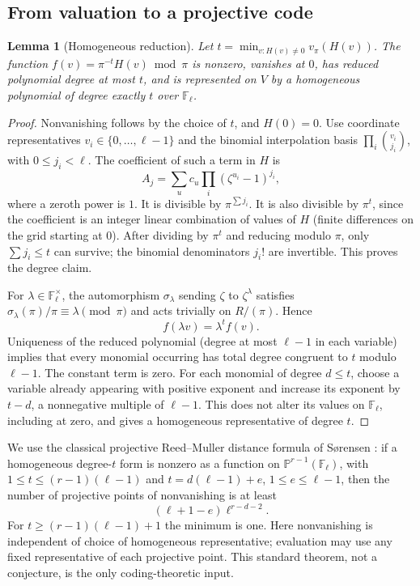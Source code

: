 \documentclass[11pt]{article}
\newtheorem{lemma}[theorem]{Lemma}
\theoremstyle{remark}\newtheorem{remark}[theorem]{Remark}
\newcommand{\F}{\mathbb F}
\begin{document}
\subsection{From valuation to a projective code}
\begin{lemma}[Homogeneous reduction]\label{lem:hom}
Let $t=\min_{v:H(v)\ne0}v_\pi(H(v))$. The function $f(v)=\pi^{-t}H(v)\bmod\pi$ is nonzero, vanishes at $0$, has reduced polynomial degree at most $t$, and is represented on $V$ by a homogeneous polynomial of degree exactly $t$ over $\F_\ell$.
\end{lemma}
\begin{proof}
Nonvanishing follows by the choice of $t$, and $H(0)=0$. Use coordinate representatives $v_i\in\{0,\dots,\ell-1\}$ and the binomial interpolation basis $\prod_i\binom{v_i}{j_i}$, with $0\le j_i<\ell$. The coefficient of such a term in $H$ is
\[
A_j=\sum_u c_u\prod_i(\zeta^{u_i}-1)^{j_i},
\]
where a zeroth power is $1$. It is divisible by $\pi^{\sum j_i}$. It is also divisible by $\pi^t$, since the coefficient is an integer linear combination of values of $H$ (finite differences on the grid starting at $0$). After dividing by $\pi^t$ and reducing modulo $\pi$, only $\sum j_i\le t$ can survive; the binomial denominators $j_i!$ are invertible. This proves the degree claim.

For $\lambda\in\F_\ell^\times$, the automorphism $\sigma_\lambda$ sending $\zeta$ to $\zeta^\lambda$ satisfies $\sigma_\lambda(\pi)/\pi\equiv\lambda\pmod\pi$ and acts trivially on $R/(\pi)$. Hence
\begin{equation}\label{eq:scaling}
f(\lambda v)=\lambda^t f(v).
\end{equation}
Uniqueness of the reduced polynomial (degree at most $\ell-1$ in each variable) implies that every monomial occurring has total degree congruent to $t$ modulo $\ell-1$. The constant term is zero. For each monomial of degree $d\le t$, choose a variable already appearing with positive exponent and increase its exponent by $t-d$, a nonnegative multiple of $\ell-1$. This does not alter its values on $\F_\ell$, including at zero, and gives a homogeneous representative of degree $t$.
\end{proof}

We use the classical projective Reed--Muller distance formula of S\o rensen \cite{sorensen,ghorpade}: if a homogeneous degree-$t$ form is nonzero as a function on $\mathbb P^{r-1}(\F_\ell)$, with $1\le t\le(r-1)(\ell-1)$ and $t=d(\ell-1)+e$, $1\le e\le\ell-1$, then the number of projective points of nonvanishing is at least
\begin{equation}\label{eq:prm}
(\ell+1-e)\ell^{r-d-2}.
\end{equation}
For $t\ge(r-1)(\ell-1)+1$ the minimum is one. Here nonvanishing is independent of choice of homogeneous representative; evaluation may use any fixed representative of each projective point. This standard theorem, not a conjecture, is the only coding-theoretic input.
\end{document}
